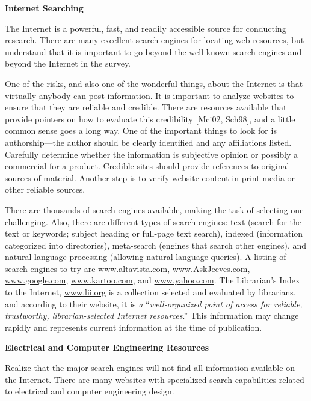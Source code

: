 \textbf{Internet Searching}

The Internet is a powerful, fast, and readily accessible source for
conducting research. There are many excellent search engines for
locating web resources, but understand that it is important to go beyond
the well-known search engines and beyond the Internet in the survey.

One of the risks, and also one of the wonderful things, about the
Internet is that virtually anybody can post information. It is important
to analyze websites to ensure that they are reliable and credible. There
are resources available that provide pointers on how to evaluate this
credibility {[}Mci02, Sch98{]}, and a little common sense goes a long
way. One of the important things to look for is authorship---the author
should be clearly identified and any affiliations listed. Carefully
determine whether the information is subjective opinion or possibly a
commercial for a product. Credible sites should provide references to
original sources of material. Another step is to verify website content
in print media or other reliable sources.

There are thousands of search engines available, making the task of
selecting one challenging. Also, there are different types of search
engines: text (search for the text or keywords; subject heading or
full-page text search), indexed (information categorized into
directories), meta-search (engines that search other engines), and
natural language processing (allowing natural language queries). A
listing of search engines to try are
\href{http://www.altavista.com}{www.altavista.com},
\href{http://www.AskJeeves.com}{www.AskJeeves.com},
\href{http://www.google.com}{www.google.com},
\href{http://www.kartoo.com}{www.kartoo.com}, and
\href{http://www.yahoo.com}{www.yahoo.com}. The Librarian's Index to the
Internet, \href{http://www.lii.org}{www.lii.org} is a collection
selected and evaluated by librarians, and according to their website, it
is \emph{a} ``\emph{well-organized point of access for reliable,
trustworthy, librarian-selected Internet resources}.'' This information
may change rapidly and represents current information at the time of
publication.

\textbf{Electrical and Computer Engineering Resources}

Realize that the major search engines will not find all information
available on the Internet. There are many websites with specialized
search capabilities related to electrical and computer engineering
design.

